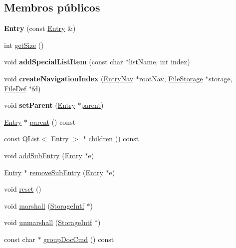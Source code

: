 \subsection*{Membros públicos}
\begin{DoxyCompactItemize}
\item 
\hypertarget{class_entry_a81e72a4ed093c655d6c927ce5aad613a}{{\bfseries Entry} (const \hyperlink{class_entry}{Entry} \&)}\label{class_entry_a81e72a4ed093c655d6c927ce5aad613a}

\item 
int \hyperlink{class_entry_a3c4029b904a61a9873e6d12785ce19a1}{get\-Size} ()
\item 
\hypertarget{class_entry_afa7d682919e0bf1789926d35c2623275}{void {\bfseries add\-Special\-List\-Item} (const char $\ast$list\-Name, int index)}\label{class_entry_afa7d682919e0bf1789926d35c2623275}

\item 
\hypertarget{class_entry_a2f8fb900ff4b8719653c068a5ee56435}{void {\bfseries create\-Navigation\-Index} (\hyperlink{class_entry_nav}{Entry\-Nav} $\ast$root\-Nav, \hyperlink{class_file_storage}{File\-Storage} $\ast$storage, \hyperlink{class_file_def}{File\-Def} $\ast$fd)}\label{class_entry_a2f8fb900ff4b8719653c068a5ee56435}

\item 
\hypertarget{class_entry_ad8755d91fef6458f89ad39aa0e1b8af0}{void {\bfseries set\-Parent} (\hyperlink{class_entry}{Entry} $\ast$\hyperlink{class_entry_a91b186338f7942fb250257a72cc4f24d}{parent})}\label{class_entry_ad8755d91fef6458f89ad39aa0e1b8af0}

\item 
\hyperlink{class_entry}{Entry} $\ast$ \hyperlink{class_entry_a91b186338f7942fb250257a72cc4f24d}{parent} () const 
\item 
const \hyperlink{class_q_list}{Q\-List}$<$ \hyperlink{class_entry}{Entry} $>$ $\ast$ \hyperlink{class_entry_ada9c959bb88621579f8b3efe4fd309b0}{children} () const 
\item 
void \hyperlink{class_entry_aa73476091529bb28701f01b8256281f7}{add\-Sub\-Entry} (\hyperlink{class_entry}{Entry} $\ast$e)
\item 
\hyperlink{class_entry}{Entry} $\ast$ \hyperlink{class_entry_a2bb4eeecfb6d1f565b27d83099f0ea4e}{remove\-Sub\-Entry} (\hyperlink{class_entry}{Entry} $\ast$e)
\item 
void \hyperlink{class_entry_ad20897c5c8bd47f5d4005989bead0e55}{reset} ()
\item 
void \hyperlink{class_entry_a7724557fcfa85c6aa15bc9cc6d5353f5}{marshall} (\hyperlink{class_storage_intf}{Storage\-Intf} $\ast$)
\item 
void \hyperlink{class_entry_a7d8a1be06f5f14602fcdab73352224cd}{unmarshall} (\hyperlink{class_storage_intf}{Storage\-Intf} $\ast$)
\item 
\hypertarget{class_entry_aca769d162f9505de5608a2eb9c3086d6}{const char $\ast$ \hyperlink{class_entry_aca769d162f9505de5608a2eb9c3086d6}{group\-Doc\-Cmd} () const }\label{class_entry_aca769d162f9505de5608a2eb9c3086d6}


\end{DoxyCompactItemize}
